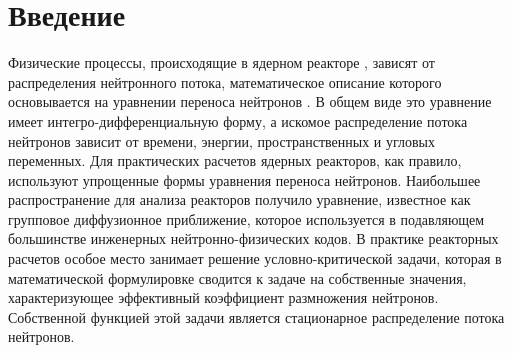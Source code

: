 \graphicspath{{./figs/}}

\section{Введение}
Физические процессы, происходящие в ядерном реакторе \cite{klimov}, зависят от распределения нейтронного потока, математическое описание которого основывается на уравнении
переноса нейтронов \cite{stacey}. В общем виде это уравнение имеет интегро-дифференциальную форму, а искомое распределение потока нейтронов зависит от времени, энергии, пространственных и угловых переменных. Для практических расчетов ядерных реакторов, как правило, используют упрощенные формы уравнения переноса нейтронов. Наибольшее распространение для анализа реакторов получило уравнение, известное как групповое диффузионное приближение\cite{ganev},\cite{marchuk} которое используется в подавляющем большинстве инженерных нейтронно-физических кодов.
В практике реакторных расчетов особое место занимает решение условно-критической задачи\cite{gonzalez}, которая в математической формулировке сводится к задаче на собственные значения, характеризующее эффективный коэффициент размножения нейтронов. Собственной функцией этой задачи является стационарное распределение потока нейтронов.

